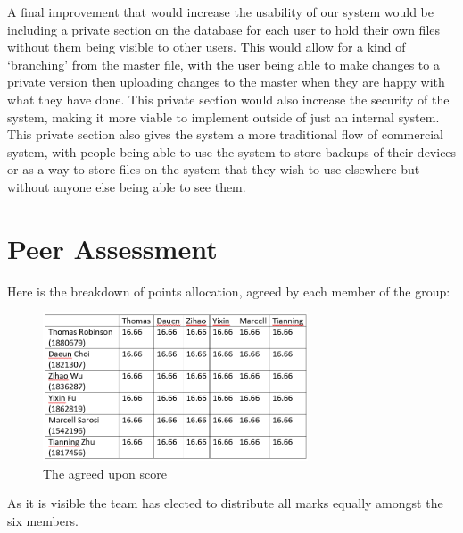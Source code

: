 \documentclass[11pt]{article}
\begin{document}
A final improvement that would increase the usability of our system would be including a private section on the database for each user to hold their own files without them being visible to other users. This would allow for a kind of ‘branching’ from the master file, with the user being able to make changes to a private version then uploading changes to the master when they are happy with what they have done. This private section would also increase the security of the system, making it more viable to implement outside of just an internal system. This private section also gives the system a more traditional flow of commercial system, with people being able to use the system to store backups of their devices or as a way to store files on the system that they wish to use elsewhere but without anyone else being able to see them.

\section{Peer Assessment}
Here is the breakdown of points allocation, agreed by each member of the group:

\begin{figure} [H]
\caption{The agreed upon score}
\centering
\includegraphics[width=0.7\textwidth]{peer.PNG}
\end{figure}

As it is visible the team has elected to distribute all marks equally amongst the six members.
\end{document}
